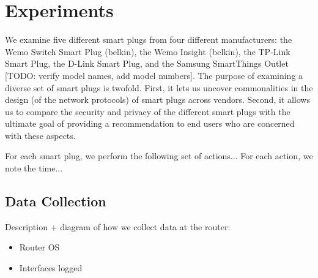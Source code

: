 \section{Experiments}
We examine five different smart plugs from four different manufacturers: the Wemo Switch Smart Plug (belkin), the Wemo Insight (belkin), the TP-Link Smart Plug, the D-Link Smart Plug, and the Samsung SmartThings Outlet {\color{red}[TODO: verify model names, add model numbers]}.
The purpose of examining a diverse set of smart plugs is twofold.
First, it lets us uncover commonalities in the design (of the network protocols) of smart plugs across vendors.
Second, it allows us to compare the security and privacy of the different smart plugs with the ultimate goal of providing a recommendation to end users who are concerned with these aspects.

For each smart plug, we perform the following set of actions... For each action, we note the time...




\subsection{Data Collection}
{
\color{red}
Description + diagram of how we collect data at the router:
\begin{itemize}
\item Router OS
\item Interfaces logged
\end{itemize}
}